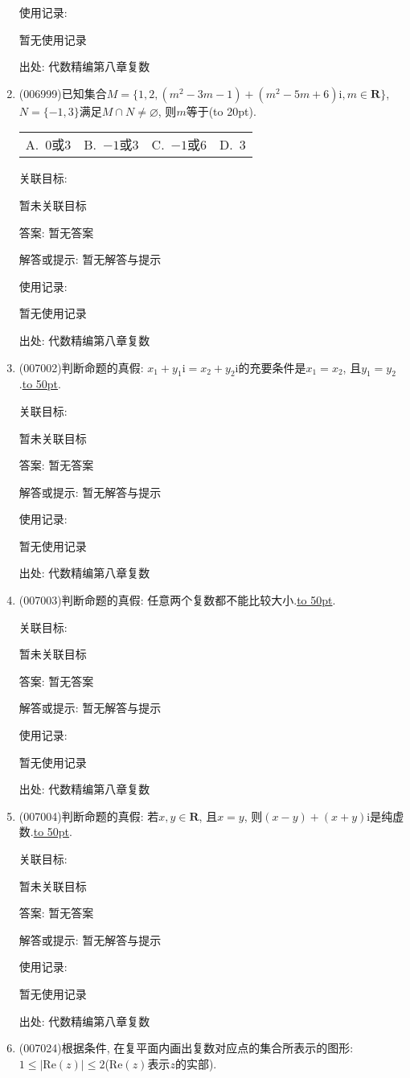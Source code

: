 \documentclass[10pt,a4paper]{article}
\newcommand{\blank}[1]{\underline{\hbox to #1pt{}}}
\newcommand{\bracket}[1]{(\hbox to #1pt{})}
\newcommand{\fourch}[4]{\par\begin{tabular}{p{.23\textwidth}p{.23\textwidth}p{.23\textwidth}p{.23\textwidth}}
A.~#1 &B.~#2& C.~#3& D.~#4
\end{tabular}}
\begin{document}
\begin{enumerate}[1.]
使用记录:

暂无使用记录


出处: 代数精编第八章复数
\item { (006999)}已知集合$M=\{1,2,(m^2-3m-1)+(m^2-5m+6)\mathrm{i},m\in \mathbf{R}\}$, $N=\{-1,3\}$满足$M\cap N\ne \varnothing$, 则$m$等于\bracket{20}.
\fourch{$0$或$3$}{$-1$或$3$}{$-1$或$6$}{$3$}


关联目标:

暂未关联目标

答案: 暂无答案

解答或提示: 暂无解答与提示

使用记录:

暂无使用记录


出处: 代数精编第八章复数
\item { (007002)}判断命题的真假: $x_1+y_1\mathrm{i}=x_2+y_2\mathrm{i}$的充要条件是$x_1=x_2$, 且$y_1=y_2$.\blank{50}.


关联目标:

暂未关联目标

答案: 暂无答案

解答或提示: 暂无解答与提示

使用记录:

暂无使用记录


出处: 代数精编第八章复数
\item { (007003)}判断命题的真假: 任意两个复数都不能比较大小.\blank{50}.


关联目标:

暂未关联目标

答案: 暂无答案

解答或提示: 暂无解答与提示

使用记录:

暂无使用记录


出处: 代数精编第八章复数
\item { (007004)}判断命题的真假: 若$x,y\in \mathbf{R}$, 且$x=y$, 则$(x-y)+(x+y)\mathrm{i}$是纯虚数.\blank{50}.


关联目标:

暂未关联目标

答案: 暂无答案

解答或提示: 暂无解答与提示

使用记录:

暂无使用记录


出处: 代数精编第八章复数
\item { (007024)}根据条件, 在复平面内画出复数对应点的集合所表示的图形: $1\le|\mathrm{Re}(z)|\le 2$($\mathrm{Re}(z)$表示$z$的实部).



\end{enumerate}
\end{document}
